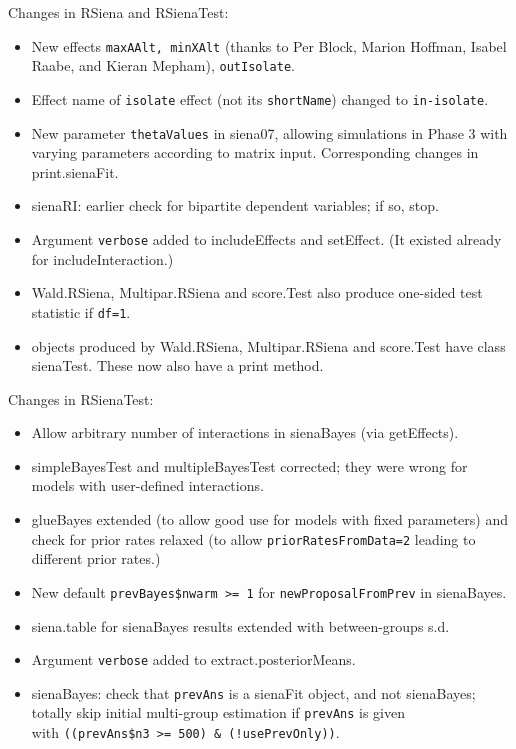 \documentclass[a4paper,fleqn,11pt]{article}
\newcommand{\+}{\, + \,}
\newcommand{\sfn}[1]{\textsf{#1}}
\begin{document}
\begin{small}
\begin{itemize}
Changes in RSiena and RSienaTest:
\begin{itemize}
   \item New effects \texttt{maxAAlt, minXAlt} (thanks to Per Block, Marion Hoffman,
     Isabel Raabe, and Kieran Mepham), \texttt{outIsolate}.
    \item Effect name of \texttt{isolate} effect (not its \texttt{shortName})
      changed to \texttt{in-isolate}.
   \item New parameter \texttt{thetaValues} in \sfn{siena07},
     allowing simulations in Phase 3
     with varying parameters according to matrix input.
     Corresponding changes in \sfn{print.sienaFit}.
   \item \sfn{sienaRI}: earlier check for bipartite dependent variables; if so, stop.
   \item Argument \texttt{verbose} added to \sfn{includeEffects} and \sfn{setEffect}.
     (It existed already for \sfn{includeInteraction}.)
  \item \sfn{Wald.RSiena}, \sfn{Multipar.RSiena} and \sfn{score.Test} also produce one-sided
     test statistic if \texttt{df=1}.
   \item objects produced by \sfn{Wald.RSiena},\sfn{ Multipar.RSiena} and \sfn{score.Test}
     have class \sfn{sienaTest}. These now also have a \sfn{print} method.

\end{itemize}

Changes in RSienaTest:
\begin{itemize}
   \item Allow arbitrary number of interactions in \sfn{sienaBayes}
        (via \sfn{getEffects}).
   \item \sfn{simpleBayesTest} and \sfn{multipleBayesTest} corrected; they were wrong
     for models with user-defined interactions.
   \item \sfn{glueBayes} extended (to allow good use for models with fixed parameters)
     and check for prior rates relaxed (to allow \texttt{priorRatesFromData=2}
     leading to different prior rates.)

   \item New default \texttt{prevBayes\$nwarm >= 1} for
        \texttt{newProposalFromPrev} in \sfn{sienaBayes}.
   \item \sfn{siena.table} for \sfn{sienaBayes} results extended with between-groups s.d.
   \item Argument \texttt{verbose} added to \sfn{extract.posteriorMeans}.
   \item \sfn{sienaBayes}: check that \texttt{prevAns} is a \sfn{sienaFit} object,
     and not \sfn{sienaBayes};\\
     totally skip initial multi-group estimation if \texttt{prevAns} is given \\
     with
     \texttt{((prevAns\$n3 >= 500) \& (!usePrevOnly))}.


\end{itemize}
\end{itemize}
\end{small}
\end{document}
